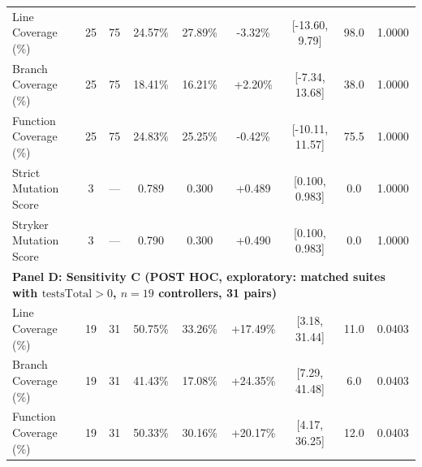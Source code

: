 \begin{table}[t]
\begin{tabular}{lcccccccc}
\midrule
Line Coverage (\%) & 25 & 75 & 24.57\% & 27.89\% & -3.32\% & [-13.60, 9.79] & 98.0 & 1.0000 \\
Branch Coverage (\%) & 25 & 75 & 18.41\% & 16.21\% & +2.20\% & [-7.34, 13.68] & 38.0 & 1.0000 \\
Function Coverage (\%) & 25 & 75 & 24.83\% & 25.25\% & -0.42\% & [-10.11, 11.57] & 75.5 & 1.0000 \\
Strict Mutation Score & 3 & --- & 0.789 & 0.300 & +0.489 & [0.100, 0.983] & 0.0 & 1.0000 \\
Stryker Mutation Score & 3 & --- & 0.790 & 0.300 & +0.490 & [0.100, 0.983] & 0.0 & 1.0000 \\
\midrule
\multicolumn{9}{l}{\textbf{Panel D: Sensitivity C (POST HOC, exploratory: matched suites with $\text{testsTotal} > 0$, $n=19$ controllers, 31 pairs)}} \\
\midrule
Line Coverage (\%) & 19 & 31 & 50.75\% & 33.26\% & +17.49\% & [3.18, 31.44] & 11.0 & 0.0403 \\
Branch Coverage (\%) & 19 & 31 & 41.43\% & 17.08\% & +24.35\% & [7.29, 41.48] & 6.0 & 0.0403 \\
Function Coverage (\%) & 19 & 31 & 50.33\% & 30.16\% & +20.17\% & [4.17, 36.25] & 12.0 & 0.0403 \\
\bottomrule
\end{tabular}
\end{table}
